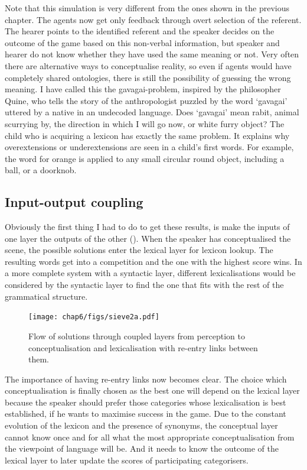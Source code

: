 Note that this simulation is very different from the 
ones shown in the previous chapter. The agents now get 
only feedback through overt selection of the referent. 
The hearer points to the identified referent and the speaker 
decides on the outcome of the game based on this 
non-verbal information, but speaker and hearer do not 
know whether they have used the same meaning or not. 
Very often there are alternative ways
to conceptualise reality, so even if agents would have
completely shared ontologies, there is still the possibility 
of guessing the wrong meaning. I have called this
the gavagai-problem, inspired by the philosopher
Quine, who tells the story of the anthropologist 
puzzled by the word `gavagai' uttered by a native 
in an undecoded language. Does `gavagai' mean rabit, animal 
scurrying by, the direction in which I will go 
now, or white furry object? 
The child who is acquiring a lexicon has
exactly the same problem. It explains why 
overextensions or underextensions
are seen in a child's first words. For example, 
the word for orange is applied to any small circular round 
object, including a ball, or a doorknob.

\subsection{Input-output coupling}

Obviously the first thing I had to do to get 
these results, is make the inputs of one layer the
outputs of the other (). When the 
speaker has conceptualised the scene, the possible
solutions enter the lexical layer for lexicon lookup. 
The resulting words get into a competition and the 
one with the highest score wins. In a more complete
system with a syntactic layer, different lexicalisations
would be considered by the syntactic layer to find 
the one that fits with the rest of the grammatical 
structure. 


\begin{figure}[htbp]
  \centerline{\texttt{[image: chap6/figs/sieve2a.pdf]}}
\caption{\label{sieve2a}Flow of solutions through 
coupled layers from perception to conceptualisation and lexicalisation with re-entry links between them.} 
\end{figure}

The importance of having re-entry links now becomes
clear. The choice which conceptualisation is finally chosen 
as the best one will depend on the lexical layer because 
the speaker should prefer those categories whose 
lexicalisation is best established, if he wants to 
maximise success in the game. Due to the constant evolution
of the lexicon and the presence of synonyms, the conceptual
layer cannot know once and for all what the most
appropriate conceptualisation from the viewpoint of 
language will be. And it needs to know the outcome of the
lexical layer to later update the scores of participating
categorisers. 

